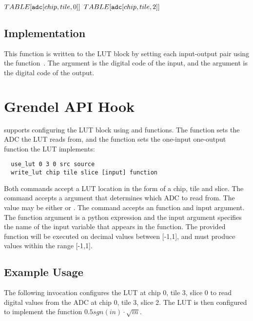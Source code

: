 \begin{algorithmic}
  \State $TABLE[\tx{adc}\hslice{chip}{tile}{0}]$
  \State $TABLE[\tx{adc}\hslice{chip}{tile}{2}]$
\EndIf
    
\end{algorithmic}

\subsection{\analoglib Implementation}

This function is written to the LUT block by setting each input-output pair
using the  function~\cite{lut.h}. The  argument is the
digital code of the input, and the  argument is the digital code of the
output.


\section{Grendel API Hook}

\grendel supports configuring the LUT block using  and
 functions. The  function sets the ADC the LUT reads
from, and the  function sets the one-input one-output function the
LUT implements:

\begin{lstlisting}
  use_lut 0 3 0 src source
  write_lut chip tile slice [input] function
\end{lstlisting}

Both commands accept a LUT location in the form of a chip, tile and slice. The
 command accepts a  argument that determines which ADC to
read from. The  value may be either  or . The
 command accepts an function and input argument. The function
argument is a python expression and the input argument specifies the name of the
input variable that appears in the function. The provided function will be
executed on decimal values between [-1,1], and must produce values within the range [-1,1].

\subsection{Example Usage}

The following invocation configures the LUT at chip 0, tile 3, slice 0 to read
digital values from the ADC at chip 0, tile 3, slice 2. The LUT is then
configured to implement the function $0.5 sgn(in) \cdot \sqrt{in}$.

